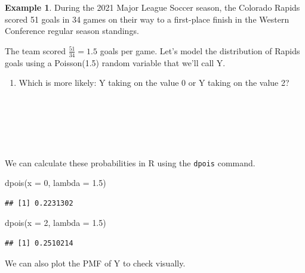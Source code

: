 \documentclass[
  11pt,
]{book}
\newenvironment{Shaded}{\begin{snugshade}}{\end{snugshade}}
\newcommand{\AttributeTok}[1]{\textcolor[rgb]{0.77,0.63,0.00}{#1}}
\newcommand{\DecValTok}[1]{\textcolor[rgb]{0.00,0.00,0.81}{#1}}
\newcommand{\FloatTok}[1]{\textcolor[rgb]{0.00,0.00,0.81}{#1}}
\newcommand{\FunctionTok}[1]{\textcolor[rgb]{0.00,0.00,0.00}{#1}}
\newcommand{\NormalTok}[1]{#1}
\providecommand{\tightlist}{%
  \setlength{\itemsep}{0pt}\setlength{\parskip}{0pt}}
\theoremstyle{definition}
\theoremstyle{definition}
\newtheorem{example}{Example}[chapter]
\theoremstyle{definition}
\theoremstyle{definition}
\theoremstyle{remark}
\begin{document}
\begin{example}
During the 2021 Major League Soccer season, the Colorado Rapids scored 51 goals in 34 games on their way to a first-place finish in the Western Conference regular season standings.

The team scored \(\frac{51}{34} = 1.5\) goals per game. Let's model the distribution of Rapids goals using a Poisson(1.5) random variable that we'll call Y.
\end{example}

\begin{enumerate}
\def\labelenumi{(\alph{enumi})}
\tightlist
\item
  Which is more likely: Y taking on the value 0 or Y taking on the value 2?\\
  \strut \\
  \strut \\
  \strut \\
\end{enumerate}

We can calculate these probabilities in R using the \texttt{dpois} command.

\begin{Shaded}
\begin{Highlighting}[]
\FunctionTok{dpois}\NormalTok{(}\AttributeTok{x =} \DecValTok{0}\NormalTok{, }\AttributeTok{lambda =} \FloatTok{1.5}\NormalTok{)}
\end{Highlighting}
\end{Shaded}

\begin{verbatim}
## [1] 0.2231302
\end{verbatim}

\begin{Shaded}
\begin{Highlighting}[]
\FunctionTok{dpois}\NormalTok{(}\AttributeTok{x =} \DecValTok{2}\NormalTok{, }\AttributeTok{lambda =} \FloatTok{1.5}\NormalTok{)}
\end{Highlighting}
\end{Shaded}

\begin{verbatim}
## [1] 0.2510214
\end{verbatim}

We can also plot the PMF of Y to check visually.
\end{document}
